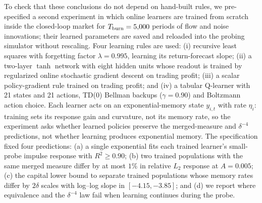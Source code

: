 To check that these conclusions do not depend on hand-built rules, we pre-specified a second experiment in which online learners are trained from scratch inside the closed-loop market for $T_{\rm burn}=5{,}000$ periods of flow and noise innovations; their learned parameters are saved and reloaded into the probing simulator without rescaling. Four learning rules are used: (i) recursive least squares with forgetting factor $\lambda=0.995$, learning its return-forecast slope; (ii) a two-layer $\tanh$ network with eight hidden units whose readout is trained by regularized online stochastic gradient descent on trading profit; (iii) a scalar policy-gradient rule trained on trading profit; and (iv) a tabular Q-learner with 21 states and 21 actions, TD(0) Bellman backups ($\gamma=0.90$) and Boltzmann action choice. Each learner acts on an exponential-memory state $y_{i,t}$ with rate $\eta_i$: training sets its response gain and curvature, not its memory rate, so the experiment asks whether learned policies preserve the merged-measure and $\delta^{-4}$ predictions, not whether learning produces exponential memory. The specification fixed four predictions: (a) a single exponential fits each trained learner's small-probe impulse response with $R^2\ge0.90$; (b) two trained populations with the same merged measure differ by at most $1\%$ in relative $L_2$ response at $A=0.005$; (c) the capital lower bound to separate trained populations whose memory rates differ by $2\delta$ scales with log--log slope in $[-4.15,-3.85]$; and (d) we report where equivalence and the $\delta^{-4}$ law fail when learning continues during the probe.

